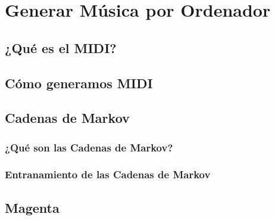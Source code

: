 \chapter{Generar Música por Ordenador}
\label{cap:generacionMusical}

\section{¿Qué es el MIDI?}


\section{Cómo generamos MIDI}

\section{Cadenas de Markov}

    \subsection{¿Qué son las Cadenas de Markov?}
    
    \subsection{Entranamiento de las Cadenas de Markov}
    
\section{Magenta}
